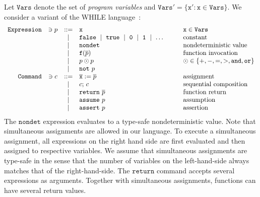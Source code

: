 
Let $\mathtt{Vars}$ denote the set of \emph{program variables} and
$\mathtt{Vars}' = \{ \mathtt{x}' : \mathtt{x} \in \mathtt{Vars} \}$.
We consider a variant of the WHILE language~\cite{NielsonHC99}:
\begin{equation*}
  \begin{array}{rccll}
    \mathtt{Expression} & \ni p & ::= &
    \mathtt{x} & \mathtt{x} \in \mathtt{Vars}\\
    & & \mid &
    \mathtt{false}\ \mid\ \mathtt{true}\ \mid\ 
    \mathtt{0}\ \mid\ \mathtt{1}\ \mid\ \ldots\hspace{.06\textwidth} &
    \textmd{constant}\\
    & & \mid &
    \mathtt{nondet} & \textmd{nondeterministic value}\\
    & & \mid &
    \mathtt{f}(\overline{p}) &
    \textmd{function invocation}\\
    & & \mid &
    p \odot p  & \odot \in \{ +, -, =, >, \mathtt{and}, \mathtt{or} \}\\
    & & \mid & \mathtt{not}\ p\\
    \mathtt{Command} & \ni c & ::= &
    \overline{\mathtt{x}} := \overline{p}
    & \textmd{assignment}\\
    & & \mid &
    c\mathtt{;}\ c &
    \textmd{sequential composition}\\
    & & \mid &
    \mathtt{return}\ \overline{p} & \textmd{function return}\\
    & & \mid &
    \mathtt{assume}\ p & \textmd{assumption}\\
    & & \mid &
    \mathtt{assert}\ p & \textmd{assertion}
  \end{array}
\end{equation*}
The $\mathtt{nondet}$ expression evaluates to a type-safe
nondeterministic value.
Note that simultaneous assignments are allowed in our language. To
execute a simultaneous assignment, all expressions on the right hand
side are first evaluated and then assigned to respective variables. 
We assume that simultaneous assignments are type-safe in the sense that the number of variables on the left-hand-side always matches that of the right-hand-side.
The $\mathtt{return}$ command accepts several expressions as arguments.
Together with simultaneous assignments, functions can have several
return values. 

